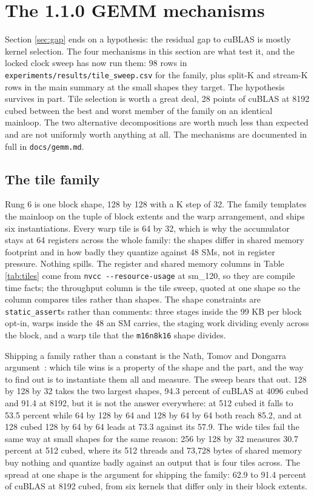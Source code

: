 \section{The 1.1.0 GEMM mechanisms}
\label{sec:mechanisms}

Section \ref{sec:gap} ends on a hypothesis: the residual gap to cuBLAS is mostly
kernel selection. The four mechanisms in this section are what test it, and the
locked clock sweep has now run them: 98 rows in
\texttt{experiments/results/tile\_sweep.csv} for the family, plus split-K and
stream-K rows in the main summary at the small shapes they target. The hypothesis
survives in part. Tile selection is worth a great deal, 28 points of cuBLAS at
8192 cubed between the best and worst member of the family on an identical
mainloop. The two alternative decompositions are worth much less than expected and
are not uniformly worth anything at all. The mechanisms are documented in full in
\texttt{docs/gemm.md}.

\subsection{The tile family}

Rung 6 is one block shape, 128 by 128 with a K step of 32. The family templates
the mainloop on the tuple of block extents and the warp arrangement, and ships six
instantiations. Every warp tile is 64 by 32, which is why the accumulator stays at
64 registers across the whole family: the shapes differ in shared memory footprint
and in how badly they quantize against 48 SMs, not in register pressure. Nothing
spills. The register and shared memory columns in Table \ref{tab:tiles} come from
\texttt{nvcc -{}-resource-usage} at sm\_120, so they are compile time facts; the
throughput column is the tile sweep, quoted at one shape so the column compares
tiles rather than shapes. The shape
constraints are \texttt{static\_assert}s rather than comments: three stages inside
the 99 KB per block opt-in, warps inside the 48 an SM carries, the staging work
dividing evenly across the block, and a warp tile that the \texttt{m16n8k16} shape
divides.

Shipping a family rather than a constant is the Nath, Tomov and Dongarra
argument~\cite{nath2010}: which tile wins is a property of the shape and the part,
and the way to find out is to instantiate them all and measure. The sweep bears
that out. 128 by 128 by 32 takes the two largest shapes, 94.3 percent of cuBLAS at
4096 cubed and 91.4 at 8192, but it is not the answer everywhere: at 512 cubed it
falls to 53.5 percent while 64 by 128 by 64 and 128 by 64 by 64 both reach 85.2,
and at 128 cubed 128 by 64 by 64 leads at 73.3 against its 57.9. The wide tiles
fail the same way at small shapes for the same reason: 256 by 128 by 32 measures
30.7 percent at 512 cubed, where its 512 threads and 73,728 bytes of shared memory
buy nothing and quantize badly against an output that is four tiles across. The
spread at one shape is the argument for shipping the family: 62.9 to 91.4 percent
of cuBLAS at 8192 cubed, from six kernels that differ only in their block extents.

